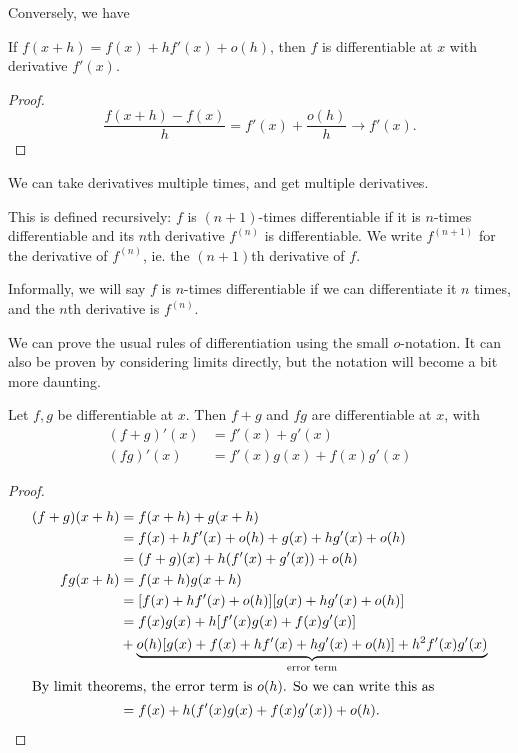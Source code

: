 \documentclass[a4paper]{article}
\begin{document}
Conversely, we have
\begin{prop}
  If $f(x + h) = f(x) + hf'(x) + o(h)$, then $f$ is differentiable at $x$ with derivative $f'(x)$.
\end{prop}
\begin{proof}
  \[
    \frac{f(x + h) - f(x)}{h} = f'(x) + \frac{o(h)}{h} \to f'(x).
  \]
\end{proof}

We can take derivatives multiple times, and get multiple derivatives.
\begin{defi}
  This is defined recursively: $f$ is $(n + 1)$-times differentiable if it is $n$-times differentiable and its $n$th derivative $f^{(n)}$ is differentiable. We write $f^{(n + 1)}$ for the derivative of $f^{(n)}$, ie. the $(n + 1)$th derivative of $f$.

  Informally, we will say $f$ is $n$-times differentiable if we can differentiate it $n$ times, and the $n$th derivative is $f^{(n)}$.
\end{defi}

We can prove the usual rules of differentiation using the small $o$-notation. It can also be proven by considering limits directly, but the notation will become a bit more daunting.
\begin{lemma}
  Let $f, g$ be differentiable at $x$. Then $f + g$ and $fg$ are differentiable at $x$, with
  \begin{align*}
    (f + g)'(x) &= f'(x) + g'(x)\\
    (fg)'(x) &= f'(x)g(x) + f(x)g'(x)
  \end{align*}
\end{lemma}

\begin{proof}
  \begin{align*}
    (f + g)(x + h) &= f(x + h) + g(x + h)\\
    &= f(x) +hf'(x) + o(h) + g(x) + hg'(x) + o(h)\\
    &= (f + g)(x) + h(f'(x) + g'(x)) + o(h)\\
    fg(x + h) &= f(x + h)g(x + h)\\
    &= [f(x) + hf'(x) + o(h)][g(x) + hg'(x) + o(h)]\\
    &= f(x)g(x) + h[f'(x)g(x) + f(x)g'(x)]\\
    &+ \underbrace{o(h)[g(x) + f(x) + hf'(x) + hg'(x) + o(h)] + h^2f'(x)g'(x)}_{\text{error term}}\\
    \intertext{By limit theorems, the error term is $o(h)$. So we can write this as}
    &= f(x) + h(f'(x)g(x) + f(x)g'(x)) + o(h).
  \end{align*}
\end{proof}
\end{document}
